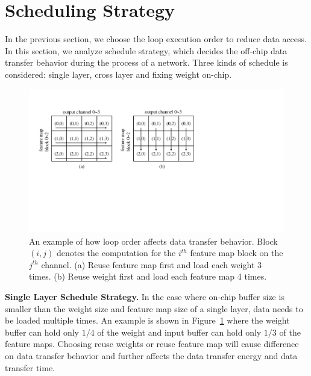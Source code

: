 \section{Scheduling Strategy}\label{sec:schedule}
In the previous section, we choose the loop execution order to reduce data access. In this section, we analyze schedule strategy, which decides the off-chip data transfer behavior during the process of a network. Three kinds of schedule is considered: single layer, cross layer and fixing weight on-chip.

\begin{figure}[t]
  \centering
  \includegraphics[width=1\columnwidth]{fig/single_layer.pdf}
  \vspace{-5pt}
  \caption{An example of how loop order affects data transfer behavior. Block $(i, j)$ denotes the computation for the $i^{th}$ feature map block on the $j^{th}$ channel. (a) Reuse feature map first and load each weight 3 times. (b) Reuse weight first and load each feature map 4 times.}
  \label{fig:single_layer}
\end{figure}

{\bf{Single Layer Schedule Strategy}.} In the case where on-chip buffer size is smaller than the weight size and feature map size of a single layer, data needs to be loaded multiple times. An example is shown in Figure~\ref{fig:single_layer} where the weight buffer can hold only $1/4$ of the weight and input buffer can hold only $1/3$ of the feature maps. Choosing reuse weights or reuse feature map will cause difference on data transfer behavior and further affects the data transfer energy and data transfer time.

